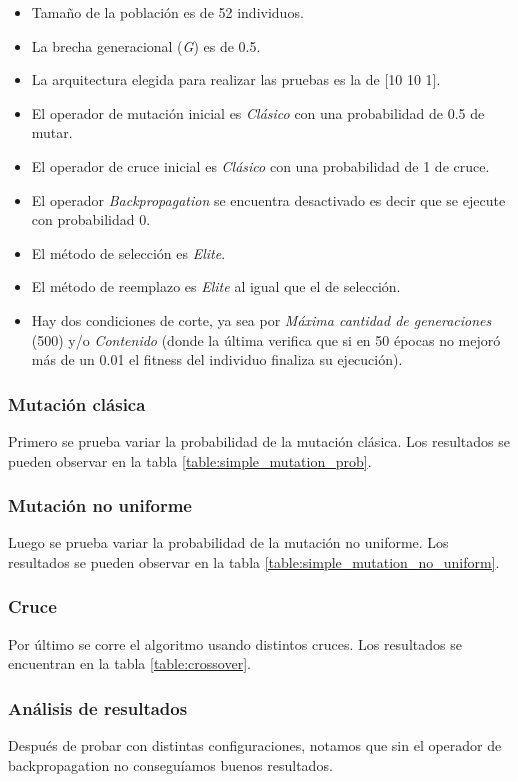 \documentclass{sig-alternate}
\begin{document}
	\begin{itemize}
		\item Tamaño de la población es de 52 individuos.
		\item La brecha generacional (\textit{G}) es de 0.5.
		\item La arquitectura elegida para realizar las pruebas es la de [10 10 1].
		\item El operador de mutación inicial es \textit{Clásico} con una probabilidad de 0.5 de mutar.
		\item El operador de cruce inicial es \textit{Clásico} con una probabilidad de 1 de cruce.
		\item El operador \textit{Backpropagation} se encuentra desactivado es decir que se ejecute con probabilidad 0.
		\item El método de selección es \textit{Elite}.
		\item El método de reemplazo es \textit{Elite} al igual que el de selección.
		\item Hay dos condiciones de corte, ya sea por \textit{Máxima cantidad
		de generaciones} (500) y/o \textit{Contenido} (donde la última verifica
		que si en 50 épocas no mejoró más de un 0.01 el fitness del individuo
		finaliza su ejecución).
	\end{itemize}

	\subsubsection{Mutación clásica}
	Primero se prueba variar la probabilidad de la mutación clásica.
	Los resultados se pueden observar en la tabla \ref{table:simple_mutation_prob}.

	\subsubsection{Mutación no uniforme}
	Luego se prueba variar la probabilidad de la mutación no uniforme.
	Los resultados se pueden observar en la tabla \ref{table:simple_mutation_no_uniform}.

	\subsubsection{Cruce}
	Por último se corre el algoritmo usando distintos cruces.
	Los resultados se encuentran en la tabla \ref{table:crossover}.

	\subsubsection{Análisis de resultados}
	Después de probar con distintas configuraciones, notamos que sin el
	operador de backpropagation no conseguíamos buenos resultados.
\end{document}
